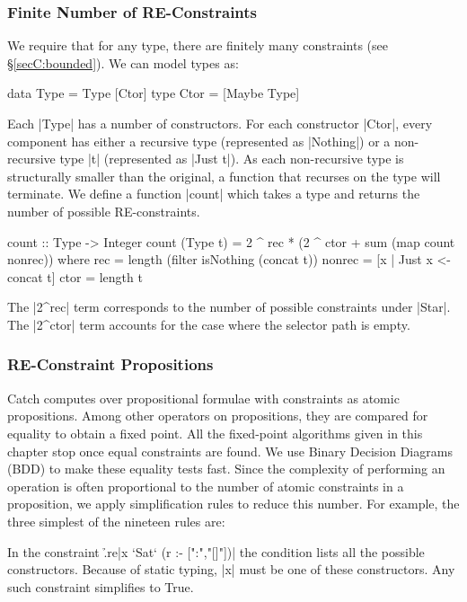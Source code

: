 \subsubsection{Finite Number of RE-Constraints}
\label{secC:finite_re}

We require that for any type, there are finitely many constraints (see \S\ref{secC:bounded}). We can model types as:

\begin{code}
data Type  = Type [Ctor]
type Ctor  = [Maybe Type]
\end{code}

Each |Type| has a number of constructors. For each constructor |Ctor|, every component has either a recursive type (represented as |Nothing|) or a non-recursive type |t| (represented as |Just t|). As each non-recursive type is structurally smaller than the original, a function that recurses on the type will terminate. We define a function |count| which takes a type and returns the number of possible RE-constraints.

\begin{code}
count :: Type -> Integer
count (Type t) = 2 ^ rec * (2 ^ ctor + sum (map count nonrec))
    where
    rec = length (filter isNothing (concat t))
    nonrec = [x | Just x <- concat t]
    ctor = length t
\end{code}

The |2^rec| term corresponds to the number of possible constraints under |Star|. The |2^ctor| term accounts for the case where the selector path is empty.


\subsubsection{RE-Constraint Propositions}
\label{secC:re-propositions}

Catch computes over propositional formulae with constraints as atomic propositions. Among other operators on propositions, they are compared for equality to obtain a fixed point. All the fixed-point algorithms given in this chapter stop once equal constraints are found. We use Binary Decision Diagrams (BDD) \cite{lee:bdd} to make these equality tests fast. Since the complexity of performing an operation is often proportional to the number of atomic constraints in a proposition, we apply simplification rules to reduce this number. For example, the three  simplest of the nineteen rules are:

 In the constraint \h{.re}|x `Sat` (r :- [":","[]"])| the condition lists all the possible constructors. Because of static typing, |x| must be one of these constructors. Any such constraint simplifies to True.

